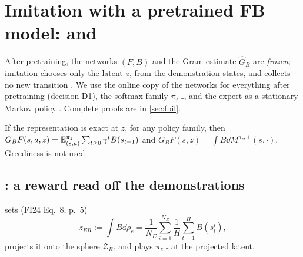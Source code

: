 \section{Imitation with a pretrained FB model: \texorpdfstring{\ERFB{} and \DMFB}{ER-FB and DM-FB}}\label{sec:m-fbil}

After pretraining, the networks $(F,B)$ and the Gram estimate $\hat G_B$ are \emph{frozen}; imitation chooses only the latent $z$, from the demonstration states, and collects no new transition \citep{pirotta2024fast}.
We use the online copy of the networks for everything after pretraining (decision D1), the softmax family $\pi_{z,\tau}$, and the expert as a stationary Markov policy . Complete proofs are in \cref{sec:fbil}.

\begin{proposition}\label{prop:m-fb-sf}
If the representation is exact at $z$, for any policy family, then $G_BF(s,a,z)=\mathbb{E}^{\pi_z}_{(s,a)}\sum_{t\ge0}\gamma^tB(s_{t+1})$ and $G_BF(s,z)=\int B\dd M^{\pi_z,+}(s,\cdot)$. Greediness is not used.
\end{proposition}

\subsection{\texorpdfstring{\ERFB}{ER-FB}: a reward read off the demonstrations}

\ERFB{} sets (FI24 Eq.~8, p.~5)
\begin{equation}\label{eq:m-zer}
z_{ER}:=\int B\dd\rho_e=\frac1{N_E}\sum_{i=1}^{N_E}\frac1H\sum_{t=1}^HB(s^i_t),
\end{equation}
projects it onto the sphere $\mathcal Z_R$, and plays $\pi_{z,\tau}$ at the projected latent.


